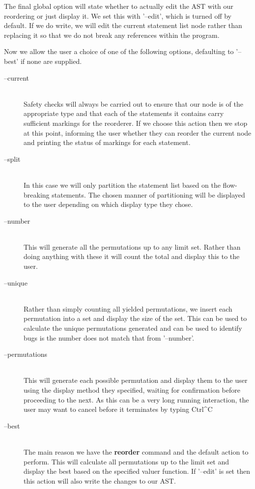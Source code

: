 \documentclass[twoside,a4paper]{report}
\begin{document}
The final global option will state whether to actually edit the AST with our reordering or just display it. We set this with '--edit', which is turned
off by default. If we do write, we will edit the current statement list node rather than replacing it so that we do not break any references within the
program.

Now we allow the user a choice of one of the following options, defaulting to '--best' if none are supplied.

\begin{description}
\item[--current] \hfill \\
Safety checks will always be carried out to ensure that our node is of the appropriate type and that each of the statements it contains carry sufficient
markings for the reorderer. If we choose this action then we stop at this point, informing the user whether they can reorder the current node and printing
the status of markings for each statement.

\item[--split] \hfill \\
In this case we will only partition the statement list based on the flow-breaking statements. The chosen manner of partitioning will be displayed to the user
depending on which display type they chose.

\item[--number] \hfill \\
This will generate all the permutations up to any limit set. Rather than doing anything with these it will count the total and display this to the user.

\item[--unique] \hfill \\
Rather than simply counting all yielded permutations, we insert each permutation into a set and display the size of the set. This can be used to calculate
the unique permutations generated and can be used to identify bugs is the number does not match that from '--number'.

\item[--permutations] \hfill \\
This will generate each possible permutation and display them to the user using the display method they specified, waiting for confirmation before proceeding
to the next. As this can be a very long running interaction, the user may want to cancel before it terminates by typing Ctrl\^{}C

\item[--best] \hfill \\
The main reason we have the \textbf{reorder} command and the default action to perform. This will calculate all permutations up to the limit set and display
the best based on the specified valuer function. If '--edit' is set then this action will also write the changes to our AST.
\end{description}
\end{document}
